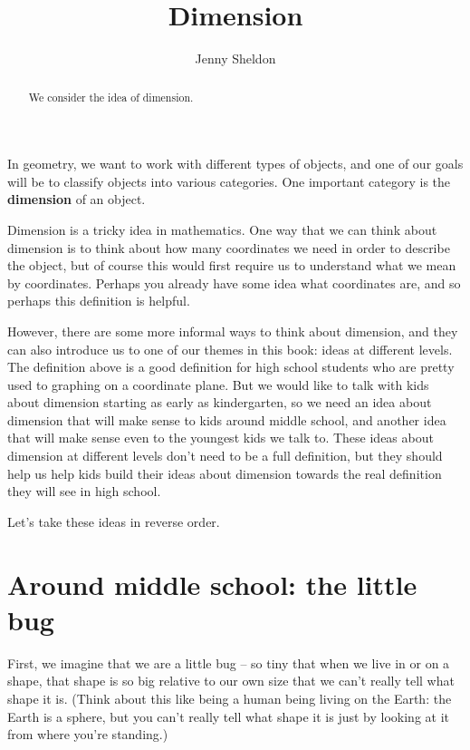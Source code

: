 \documentclass{ximera}
\title{Dimension}
\author{Jenny Sheldon}
\begin{document}
\begin{abstract}
We consider the idea of dimension.
\end{abstract}
\maketitle

In geometry, we want to work with different types of objects, and one of our goals will be to classify objects into various categories. One important category is the {\bf dimension} of an object.

Dimension is a tricky idea in mathematics. One way that we can think about dimension is to think about how many coordinates we need in order to describe the object, but of course this would first require us to understand what we mean by coordinates. Perhaps you already have some idea what coordinates are, and so perhaps this definition is helpful.

However, there are some more informal ways to think about dimension, and they can also introduce us to one of our themes in this book: ideas at different levels. The definition above is a good definition for high school students who are pretty used to graphing on a coordinate plane. But we would like to talk with kids about dimension starting as early as kindergarten, so we need an idea about dimension that will make sense to kids around middle school, and another idea that will make sense even to the youngest kids we talk to. These ideas about dimension at different levels don't need to be a full definition, but they should help us help kids build their ideas about dimension towards the real definition they will see in high school. 

Let's take these ideas in reverse order.

\section{Around middle school: the little bug}

First, we imagine that we are a little bug -- so tiny that when we live in or on a shape, that shape is so big relative to our own size that we can't really tell what shape it is. (Think about this like being a human being living on the Earth: the Earth is a sphere, but you can't really tell what shape it is just by looking at it from where you're standing.)
\end{document}
